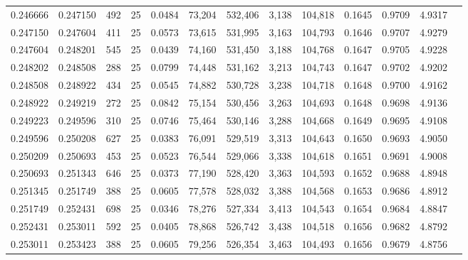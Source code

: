 \begin{tabular}{rrrrrrrrrrrrr}
0.246666 & 0.247150 &   492 &  25 &                                     0.0484 &  73,204 & 532,406 &   3,138 & 104,818 & 0.1645 & 0.9709 & 4.9317 \\
0.247150 & 0.247604 &   411 &  25 &                                     0.0573 &  73,615 & 531,995 &   3,163 & 104,793 & 0.1646 & 0.9707 & 4.9279 \\
0.247604 & 0.248201 &   545 &  25 &                                     0.0439 &  74,160 & 531,450 &   3,188 & 104,768 & 0.1647 & 0.9705 & 4.9228 \\
0.248202 & 0.248508 &   288 &  25 &                                     0.0799 &  74,448 & 531,162 &   3,213 & 104,743 & 0.1647 & 0.9702 & 4.9202 \\
0.248508 & 0.248922 &   434 &  25 &                                     0.0545 &  74,882 & 530,728 &   3,238 & 104,718 & 0.1648 & 0.9700 & 4.9162 \\
0.248922 & 0.249219 &   272 &  25 &                                     0.0842 &  75,154 & 530,456 &   3,263 & 104,693 & 0.1648 & 0.9698 & 4.9136 \\
0.249223 & 0.249596 &   310 &  25 &                                     0.0746 &  75,464 & 530,146 &   3,288 & 104,668 & 0.1649 & 0.9695 & 4.9108 \\
0.249596 & 0.250208 &   627 &  25 &                                     0.0383 &  76,091 & 529,519 &   3,313 & 104,643 & 0.1650 & 0.9693 & 4.9050 \\
0.250209 & 0.250693 &   453 &  25 &                                     0.0523 &  76,544 & 529,066 &   3,338 & 104,618 & 0.1651 & 0.9691 & 4.9008 \\
0.250693 & 0.251343 &   646 &  25 &                                     0.0373 &  77,190 & 528,420 &   3,363 & 104,593 & 0.1652 & 0.9688 & 4.8948 \\
0.251345 & 0.251749 &   388 &  25 &                                     0.0605 &  77,578 & 528,032 &   3,388 & 104,568 & 0.1653 & 0.9686 & 4.8912 \\
0.251749 & 0.252431 &   698 &  25 &                                     0.0346 &  78,276 & 527,334 &   3,413 & 104,543 & 0.1654 & 0.9684 & 4.8847 \\
0.252431 & 0.253011 &   592 &  25 &                                     0.0405 &  78,868 & 526,742 &   3,438 & 104,518 & 0.1656 & 0.9682 & 4.8792 \\
0.253011 & 0.253423 &   388 &  25 &                                     0.0605 &  79,256 & 526,354 &   3,463 & 104,493 & 0.1656 & 0.9679 & 4.8756 \\

\end{tabular}
